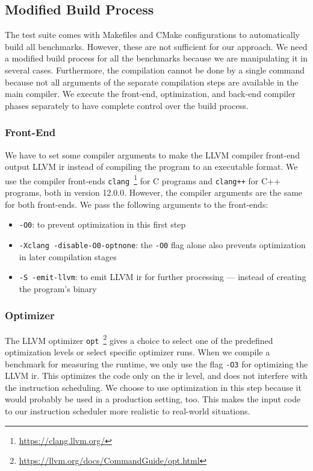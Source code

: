 \subsection{Modified Build Process}
\label{sec:approach:build_process}
The test suite comes with Makefiles and CMake configurations to automatically build all benchmarks.
However, these are not sufficient for our approach.
We need a modified build process for all the benchmarks because we are manipulating it in several cases.
Furthermore, the compilation cannot be done by a single command because not all arguments of the separate compilation steps are available in the main compiler.
We execute the front-end, optimization, and back-end compiler phases separately to have complete control over the build process.

\subsubsection{Front-End}
We have to set some compiler arguments to make the LLVM compiler front-end output LLVM \ac{ir} instead of compiling the program to an executable format.
We use the compiler front-ends \lstinline{clang}~\footnote{\url{https://clang.llvm.org/}} for C programs and \lstinline{clang++} for C++ programs, both in version 12.0.0.
However, the compiler arguments are the same for both front-ends.
We pass the following arguments to the front-ends:
\begin{itemize}
    \item \lstinline{-O0}: to prevent optimization in this first step
    \item \lstinline{-Xclang -disable-O0-optnone}: the \lstinline{-O0} flag alone also prevents optimization in later compilation stages
    \item \lstinline{-S -emit-llvm}: to emit LLVM \ac{ir} for further processing --- instead of creating the program's binary
\end{itemize}

\subsubsection{Optimizer}
The LLVM optimizer \lstinline{opt}~\footnote{\url{https://llvm.org/docs/CommandGuide/opt.html}} gives a choice to select one of the predefined optimization levels or select specific optimizer runs.
When we compile a benchmark for measuring the runtime, we only use the flag \lstinline{-O3} for optimizing the LLVM \ac{ir}.
This optimizes the code only on the \ac{ir} level, and does not interfere with the instruction scheduling.
We choose to use optimization in this step because it would probably be used in a production setting, too.
This makes the input code to our instruction scheduler more realistic to real-world situations.

